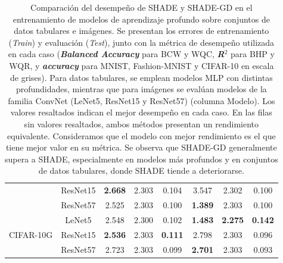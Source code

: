 \begin{table}[tbp]
{\begin{tabular}{|c|c|ccc|ccc|}
                                   & ResNet15                         & \multicolumn{1}{c|}{\textbf{2.668}} & \multicolumn{1}{c|}{2.303}   & 0.104                  & \multicolumn{1}{c|}{3.547}            & \multicolumn{1}{c|}{2.302}            & 0.100                             \\ \cline{2-8} 
                                   & ResNet57                         & \multicolumn{1}{c|}{2.525}          & \multicolumn{1}{c|}{2.303}   & 0.100                  & \multicolumn{1}{c|}{\textbf{1.389}}   & \multicolumn{1}{c|}{2.303}            & 0.100                             \\ \hline
\multirow{3}{*}{CIFAR-10G}        & LeNet5                           & \multicolumn{1}{c|}{2.548}          & \multicolumn{1}{c|}{2.300}   & 0.102                  & \multicolumn{1}{c|}{\textbf{1.483}}   & \multicolumn{1}{c|}{\textbf{2.275}}   & \textbf{0.142}                    \\ \cline{2-8} 
                                   & ResNet15                         & \multicolumn{1}{c|}{\textbf{2.536}} & \multicolumn{1}{c|}{2.303}   & \textbf{0.111}         & \multicolumn{1}{c|}{2.798}            & \multicolumn{1}{c|}{2.303}            & 0.096                             \\ \cline{2-8} 
                                   & ResNet57                         & \multicolumn{1}{c|}{2.723}          & \multicolumn{1}{c|}{2.303}   & 0.099                  & \multicolumn{1}{c|}{\textbf{2.701}}   & \multicolumn{1}{c|}{2.303}            & 0.093                             \\ \hline
\end{tabular}}
\caption[Comparación del desempeño de SHADE y SHADE-GD en el entrenamiento de modelos de aprendizaje profundo sobre conjuntos de datos tabulares e imágenes]{Comparación del desempeño de SHADE y SHADE-GD en el entrenamiento de modelos de aprendizaje profundo sobre conjuntos de datos tabulares e imágenes. Se presentan los errores de entrenamiento (\textit{Train}) y evaluación (\textit{Test}), junto con la métrica de desempeño utilizada en cada caso (\textbf{\textit{Balanced Accuracy}} para BCW y WQC, \textbf{\emph{R$^2$}}  para BHP y WQR, y \textbf{\textit{accuracy}} para MNIST, Fashion-MNIST y CIFAR-10 en escala de grises). Para datos tabulares, se emplean modelos MLP con distintas profundidades, mientras que para imágenes se evalúan modelos de la familia ConvNet (LeNet5, ResNet15 y ResNet57)  (columna Modelo). Los valores resaltados indican el mejor desempeño en cada caso. En las filas sin valores resaltados, ambos métodos presentan un rendimiento equivalente. Consideramos que el modelo con mejor rendimiento es el que tiene mejor valor en su métrica. Se observa que SHADE-GD generalmente supera a SHADE, especialmente en modelos más profundos y en conjuntos de datos tabulares, donde SHADE tiende a deteriorarse.}
\label{tab:shadevsshadegd}
\end{table}






